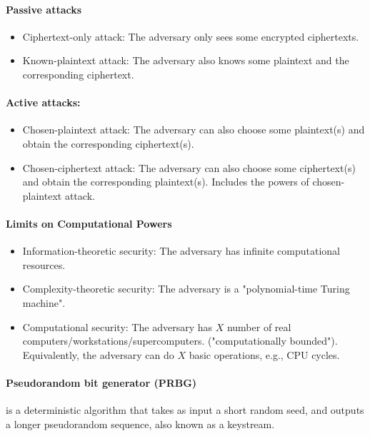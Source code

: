 \documentclass[11pt]{article}
\begin{document}
\paragraph{Passive attacks}
\begin{itemize}
    \item Ciphertext-only attack: The adversary only sees some encrypted ciphertexts.
    \item Known-plaintext attack: The adversary also knows some plaintext and the corresponding ciphertext.
\end{itemize}

\paragraph{Active attacks:}
\begin{itemize}
    \item Chosen-plaintext attack: The adversary can also choose some plaintext(s) and obtain the corresponding ciphertext(s).
    \item Chosen-ciphertext attack: The adversary can also choose some ciphertext(s) and obtain the corresponding plaintext(s). Includes the powers of chosen-plaintext attack.
\end{itemize}

\paragraph{Limits on Computational Powers}

\begin{itemize}
    \item Information-theoretic security: The adversary has infinite computational resources.
    \item Complexity-theoretic security: The adversary is a "polynomial-time Turing machine".
    \item Computational security: The adversary has $X$ number of real computers/workstations/supercomputers. ("computationally bounded"). Equivalently, the adversary can do $X$ basic operations, e.g., CPU cycles.
\end{itemize}

\paragraph{Pseudorandom bit generator (PRBG)} is a deterministic algorithm that takes as input a short random seed, and outputs a longer pseudorandom sequence, also known as a keystream.
\end{document}
